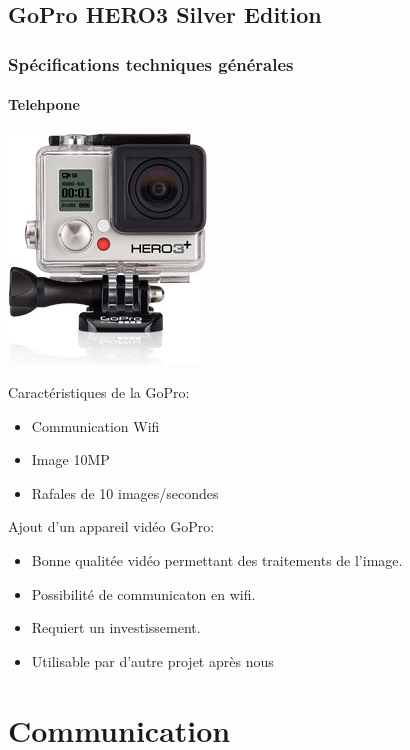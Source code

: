 \documentclass[transparent]{beamer}
\begin{document}
\subsection{GoPro HERO3 Silver Edition}
\begin{frame}
	\frametitle{Spécifications techniques générales}
	\framesubtitle{Telehpone}
	\begin{center}
 	\includegraphics[height=0.8\textheight]{images/gopro.jpg} 
	\end{center}

\end{frame}

\begin{frame}
	\begin{block}{Caractéristiques de la GoPro:}
			\begin{itemize}
				\item Communication Wifi
				\item Image 10MP
				\item Rafales de 10 images/secondes
			\end{itemize}
	\end{block}
	\begin{block}{Ajout d'un appareil vidéo GoPro:}
			\begin{itemize}
				\item Bonne qualitée vidéo permettant des traitements de l'image.
				\item Possibilité de communicaton en wifi.
				\item Requiert un investissement.
				\item Utilisable par d'autre projet après nous
			\end{itemize}
	\end{block}
\end{frame}

\section{Communication}
\end{document}
